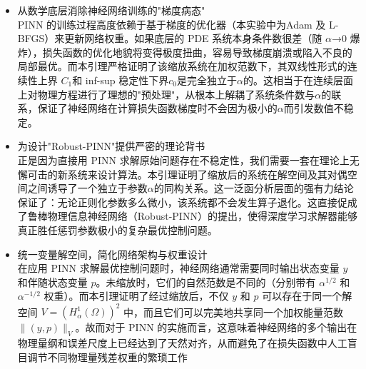 \documentclass{xmu}
\theoremstyle{plain}
\theoremstyle{remark}
\begin{document}
\begin{itemize}
  \item 从数学底层消除神经网络训练的"梯度病态"\\
  PINN 的训练过程高度依赖于基于梯度的优化器（本实验中为Adam 及 L-BFGS）来更新网络权重。如果底层的 PDE 系统本身条件数很差（随 $\alpha$→0 爆炸），损失函数的优化地貌将变得极度扭曲，容易导致梯度崩溃或陷入不良的局部最优。而本引理严格证明了该缩放系统在加权范数下，其双线性形式的连续性上界 $C_1$和 inf-sup 稳定性下界$c_0$是完全独立于$\alpha$的。这相当于在连续层面上对物理方程进行了理想的"预处理"，从根本上解耦了系统条件数与$\alpha$的联系，保证了神经网络在计算损失函数梯度时不会因为极小的$\alpha$而引发数值不稳定。

  \item 为设计"Robust-PINN"提供严密的理论背书\\
  正是因为直接用 PINN 求解原始问题存在不稳定性，我们需要一套在理论上无懈可击的新系统来设计算法。本引理证明了缩放后的系统在解空间及其对偶空间之间诱导了一个独立于参数$\alpha$的同构关系。这一泛函分析层面的强有力结论保证了：无论正则化参数多么微小，该系统都不会发生算子退化。这直接促成了鲁棒物理信息神经网络（Robust-PINN）的提出，使得深度学习求解器能够真正胜任惩罚参数极小的复杂最优控制问题。

  \item 统一变量解空间，简化网络架构与权重设计\\
  在应用 PINN 求解最优控制问题时，神经网络通常需要同时输出状态变量 $y$ 和伴随状态变量 $p$。未缩放时，它们的自然范数是不同的（分别带有 $\alpha^{1/2}$ 和 $\alpha^{-1/2}$ 权重）。而本引理证明了经过缩放后，不仅 $y$ 和 $p$ 可以存在于同一个解空间 $V = (H_\alpha^1(\Omega))^2$ 中，而且它们可以完美地共享同一个加权能量范数 $\|(y,p)\|_V$。故而对于 PINN 的实施而言，这意味着神经网络的多个输出在物理量纲和误差尺度上已经达到了天然对齐，从而避免了在损失函数中人工盲目调节不同物理量残差权重的繁琐工作
\end{itemize}


%
\end{document}
